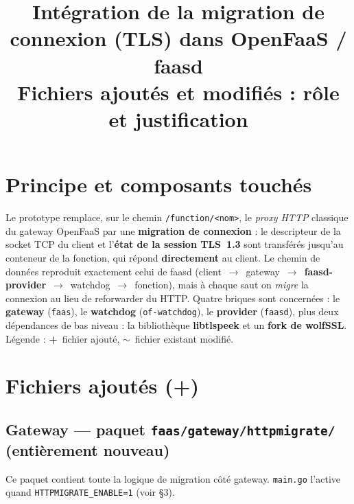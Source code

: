 \documentclass[10pt,a4paper]{article}
\title{\vspace{-1.3cm}\textbf{Intégration de la migration de connexion (TLS) dans OpenFaaS / faasd}\\
\large Fichiers ajoutés et modifiés : rôle et justification}
\author{}\date{}
\newcommand{\code}[1]{\texttt{\small #1}}
\newcommand{\add}{\textcolor{green!45!black}{\textbf{+}}}
\newcommand{\mod}{\textcolor{orange!75!black}{\textbf{$\sim$}}}
\begin{document}
\maketitle
\vspace{-1.35cm}

\section{Principe et composants touchés}
Le prototype remplace, sur le chemin \code{/function/<nom>}, le \emph{proxy HTTP} classique du gateway
OpenFaaS par une \textbf{migration de connexion} : le descripteur de la socket TCP du client et
l'\textbf{état de la session TLS~1.3} sont transférés jusqu'au conteneur de la fonction, qui répond
\textbf{directement} au client. Le chemin de données reproduit exactement celui de faasd
(client~$\rightarrow$~gateway~$\rightarrow$~\textbf{faasd-provider}~$\rightarrow$~watchdog~$\rightarrow$~fonction),
mais à chaque saut on \emph{migre} la connexion au lieu de reforwarder du HTTP. Quatre briques sont
concernées : le \textbf{gateway} (\code{faas}), le \textbf{watchdog} (\code{of-watchdog}), le
\textbf{provider} (\code{faasd}), plus deux dépendances de bas niveau : la bibliothèque
\textbf{libtlspeek} et un \textbf{fork de wolfSSL}. Légende : \add~fichier ajouté, \mod~fichier
existant modifié.

\section{Fichiers ajoutés (\add)}

\subsection{Gateway — paquet \code{faas/gateway/httpmigrate/} (entièrement nouveau)}
Ce paquet contient toute la logique de migration côté gateway. \code{main.go} l'active quand
\code{HTTPMIGRATE\_ENABLE=1} (voir §3).
\end{document}
